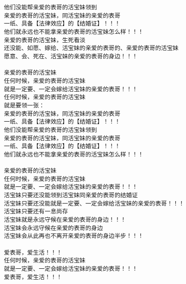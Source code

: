 \documentclass[9pt, b5paper]{article}
\begin{document}
\begin{itemize}
\begin{verbatim}
他们没能帮亲爱的表哥的活宝妹领到
亲爱的表哥的活宝妹，同活宝妹的亲爱的表哥
一纸、具备【法律效应】的【结婚证】！！！
他们就永远也不能拿亲爱的表哥的活宝妹怎么样！！！
亲爱的表哥的活宝妹，生死看淡
还没能、如愿、嫁给、活宝妹的亲爱的表哥的、亲爱的表哥的活宝妹
愿意、会、死在、活宝妹的亲爱的表哥的身边！！！

亲爱的表哥的活宝妹
任何时候，亲爱的表哥的活宝妹
就是一定要、一定会嫁给活宝妹的亲爱的表哥！！！
任何时候，亲爱的表哥的活宝妹
就是要领一张：
亲爱的表哥的活宝妹，同活宝妹的亲爱的表哥
一纸、具备【法律效应】的【结婚证】！！！
他们没能帮亲爱的表哥的活宝妹领到
亲爱的表哥的活宝妹，同活宝妹的亲爱的表哥
一纸、具备【法律效应】的【结婚证】！！！
他们就永远也不能拿亲爱的表哥的活宝妹怎么样！！！

亲爱的表哥的活宝妹
任何时候，亲爱的表哥的活宝妹
就是一定要、一定会嫁给活宝妹的亲爱的表哥！！！
活宝妹只要还没能领到活宝妹同亲爱的表哥的结婚证
活宝妹只要还没能就是一定要、一定会嫁给活宝妹的亲爱的表哥！！！
活宝妹只要还有一息尚存
活宝妹就是永远守候在亲爱的表哥的身边！！！
活宝妹会永远守候在亲爱的表哥的身边
活宝妹会从此再也不离开亲爱的表哥的身边半步！！！

爱表哥，爱生活！！！
任何时候，亲爱的表哥的活宝妹
就是一定要、一定会嫁给活宝妹的亲爱的表哥！！！
爱表哥，爱生活！！！
\end{verbatim}
\end{itemize}
\end{document}

